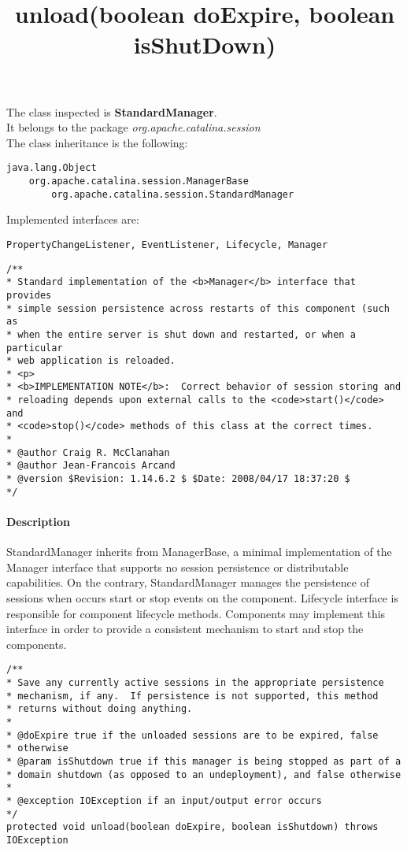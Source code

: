 The class inspected is \textbf{StandardManager}.\\It belongs to the package \textit{org.apache.catalina.session}\\
The class inheritance is the following:
\begin{verbatim}
java.lang.Object
    org.apache.catalina.session.ManagerBase
        org.apache.catalina.session.StandardManager
\end{verbatim}

Implemented interfaces are:
\begin{verbatim}
PropertyChangeListener, EventListener, Lifecycle, Manager
\end{verbatim}
\lstset{firstnumber=79}
\begin{lstlisting}
/**
* Standard implementation of the <b>Manager</b> interface that provides
* simple session persistence across restarts of this component (such as
* when the entire server is shut down and restarted, or when a particular
* web application is reloaded.
* <p>
* <b>IMPLEMENTATION NOTE</b>:  Correct behavior of session storing and
* reloading depends upon external calls to the <code>start()</code> and
* <code>stop()</code> methods of this class at the correct times.
*
* @author Craig R. McClanahan
* @author Jean-Francois Arcand
* @version $Revision: 1.14.6.2 $ $Date: 2008/04/17 18:37:20 $
*/
\end{lstlisting}
\paragraph{Description} StandardManager inherits from ManagerBase, a minimal implementation of the Manager interface that supports no session persistence or distributable capabilities. On the contrary, StandardManager manages the persistence of sessions when occurs start or stop events on the component. Lifecycle interface is responsible for component lifecycle methods. Components may implement this interface in order to provide a consistent mechanism to start and stop the components.\\

\title{{\large \textbf{unload(boolean doExpire, boolean isShutDown)}}}
\lstset{firstnumber=626}
\begin{lstlisting}
/**
* Save any currently active sessions in the appropriate persistence
* mechanism, if any.  If persistence is not supported, this method
* returns without doing anything.
*
* @doExpire true if the unloaded sessions are to be expired, false
* otherwise
* @param isShutdown true if this manager is being stopped as part of a
* domain shutdown (as opposed to an undeployment), and false otherwise
*
* @exception IOException if an input/output error occurs
*/
protected void unload(boolean doExpire, boolean isShutdown) throws IOException
\end{lstlisting}
